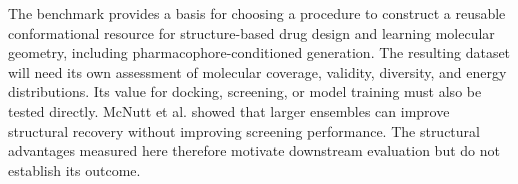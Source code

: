 The benchmark provides a basis for choosing a procedure to construct a reusable conformational
resource for structure-based drug design and learning molecular geometry, including
pharmacophore-conditioned generation. The resulting dataset will need its own assessment of
molecular coverage, validity, diversity, and energy distributions. Its value for docking,
screening, or model training must also be tested directly. McNutt et al.\cite{mcnutt2023conformers}
showed that larger ensembles can improve structural recovery without improving screening
performance. The structural advantages measured here therefore motivate downstream evaluation
but do not establish its outcome.
